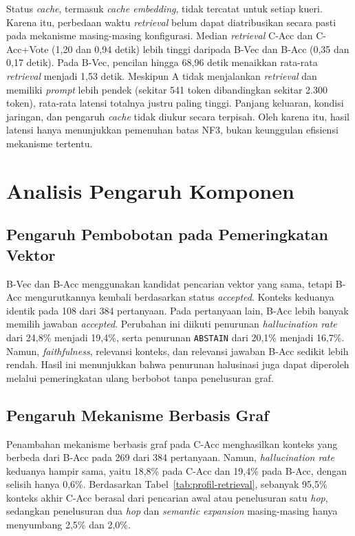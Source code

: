 Status \emph{cache}, termasuk \emph{cache embedding}, tidak tercatat untuk setiap kueri. Karena itu, perbedaan waktu \emph{retrieval} belum dapat diatribusikan secara pasti pada mekanisme masing-masing konfigurasi. Median \emph{retrieval} C-Acc dan C-Acc+Vote (1,20 dan 0,94 detik) lebih tinggi daripada B-Vec dan B-Acc (0,35 dan 0,17 detik). Pada B-Vec, pencilan hingga 68,96 detik menaikkan rata-rata \emph{retrieval} menjadi 1,53 detik. Meskipun A tidak menjalankan \emph{retrieval} dan memiliki \emph{prompt} lebih pendek (sekitar 541 token dibandingkan sekitar 2.300 token), rata-rata latensi totalnya justru paling tinggi. Panjang keluaran, kondisi jaringan, dan pengaruh \emph{cache} tidak diukur secara terpisah. Oleh karena itu, hasil latensi hanya menunjukkan pemenuhan batas NF3, bukan keunggulan efisiensi mekanisme tertentu.
\section{Analisis Pengaruh Komponen}
\label{sec:analisis-komponen}
\subsection{Pengaruh Pembobotan pada Pemeringkatan Vektor}
\label{subsec:analisis-pembobotan}
B-Vec dan B-Acc menggunakan kandidat pencarian vektor yang sama, tetapi B-Acc mengurutkannya kembali berdasarkan status \emph{accepted}. Konteks keduanya identik pada 108 dari 384 pertanyaan. Pada pertanyaan lain, B-Acc lebih banyak memilih jawaban \emph{accepted}. Perubahan ini diikuti penurunan \emph{hallucination rate} dari 24,8\% menjadi 19,4\%, serta penurunan \texttt{ABSTAIN} dari 20,1\% menjadi 16,7\%. Namun, \emph{faithfulness}, relevansi konteks, dan relevansi jawaban B-Acc sedikit lebih rendah. Hasil ini menunjukkan bahwa penurunan halusinasi juga dapat diperoleh melalui pemeringkatan ulang berbobot tanpa penelusuran graf.

\subsection{Pengaruh Mekanisme Berbasis Graf}
\label{subsec:analisis-graf}

Penambahan mekanisme berbasis graf pada C-Acc menghasilkan konteks yang berbeda dari B-Acc pada 269 dari 384 pertanyaan. Namun, \emph{hallucination rate} keduanya hampir sama, yaitu 18,8\% pada C-Acc dan 19,4\% pada B-Acc, dengan selisih hanya 0,6\%. Berdasarkan Tabel~\ref{tab:profil-retrieval}, sebanyak 95,5\% konteks akhir C-Acc berasal dari pencarian awal atau penelusuran satu \emph{hop}, sedangkan penelusuran dua \emph{hop} dan \emph{semantic expansion} masing-masing hanya menyumbang 2,5\% dan 2,0\%.

